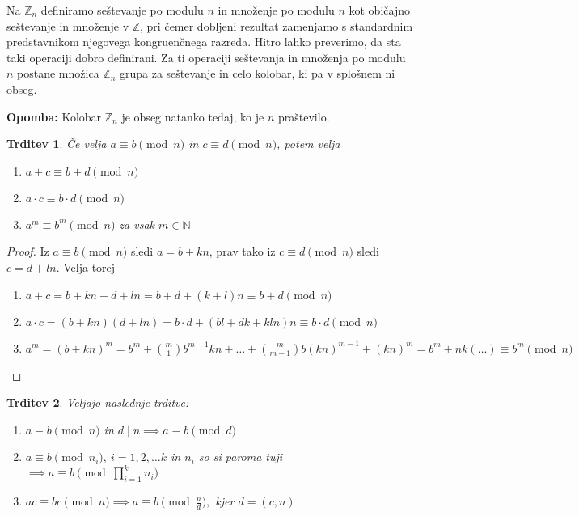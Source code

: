 \documentclass[12pt, a4paper]{article}
\newtheorem{trd}{Trditev}
\newenvironment{opom}[1][]{\par\medskip\noindent \textbf{Opomba: }}{\medskip}
\begin{document}
Na $\mathbb{Z}_{n}$ definiramo seštevanje po modulu $n$ in množenje po modulu $n$ kot običajno seštevanje in množenje v $\mathbb{Z}$, pri čemer dobljeni rezultat zamenjamo s standardnim predstavnikom njegovega kongruenčnega razreda. Hitro lahko preverimo, da sta taki operaciji dobro definirani. Za ti operaciji seštevanja in množenja po modulu $n$ postane množica $\mathbb{Z}_{n}$ grupa za seštevanje in celo kolobar, ki pa v splošnem ni obseg.

\begin{opom}
Kolobar $\mathbb{Z}_{n}$ je obseg natanko tedaj, ko je $n$ praštevilo.
\end{opom}

\begin{trd}
Če velja $a\equiv b \pmod n$ in $c\equiv d \pmod n$, potem velja
\begin{enumerate}
\item $a+c\equiv b+d \pmod n$
\item $a\cdot c\equiv b\cdot d \pmod n$
\item $a^{m}\equiv b^{m} \pmod n$ za vsak $m\in \mathbb{N}$
\end{enumerate}
\end{trd}

\begin{proof}
Iz $a\equiv b \pmod n$ sledi $a=b+kn$, prav tako iz $c\equiv d \pmod n$ sledi $c=d+ln$. Velja torej
\begin{enumerate}
\item $a+c=b+kn + d + ln= b+d +(k+l)n \equiv b+d \pmod n$
\item $a\cdot c=(b+kn)(d+ln)=b\cdot d +(bl+dk+kln)n\equiv b\cdot d\pmod n$
\item $a^{m}=(b+kn)^{m}=b^{m}+\binom{m}{1}b^{m-1}kn+\dots+\binom{m}{m-1}b(kn)^{m-1} + (kn)^{m}=b^{m}+nk(\ldots)\equiv b^{m} \pmod n$
\end{enumerate}
\end{proof}

\begin{trd}
\label{osnovne}
Veljajo naslednje trditve:
\begin{enumerate}
\item $a\equiv b \pmod n$ in $d\mid n \implies a\equiv b\pmod d$
\item $a\equiv b \pmod{n_{i}},\ i=1,2,\ldots k$ in $n_{i}$ so si paroma tuji$\implies a\equiv b\pmod {\prod_{i=1}^{k} n_{i}}$
\item $ac\equiv bc\pmod n \implies a\equiv b\pmod{\frac{n}{d}},$ kjer $d=(c,n)$
\end{enumerate}
\end{trd}
\end{document}
